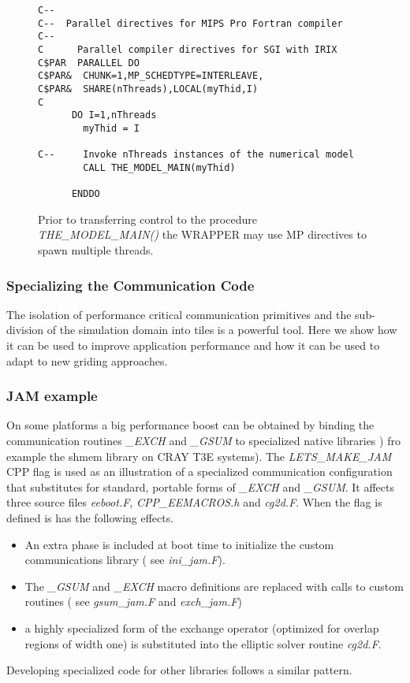 \begin{figure}
\begin{verbatim}
C--
C--  Parallel directives for MIPS Pro Fortran compiler
C--
C      Parallel compiler directives for SGI with IRIX
C$PAR  PARALLEL DO
C$PAR&  CHUNK=1,MP_SCHEDTYPE=INTERLEAVE,
C$PAR&  SHARE(nThreads),LOCAL(myThid,I)
C
      DO I=1,nThreads
        myThid = I

C--     Invoke nThreads instances of the numerical model
        CALL THE_MODEL_MAIN(myThid)

      ENDDO
\end{verbatim}
\caption{Prior to transferring control to
the procedure {\em THE\_MODEL\_MAIN()} the WRAPPER may use
MP directives to spawn multiple threads.
} \label{fig:mp_directives}
\end{figure}


\subsubsection{Specializing the Communication Code}

The isolation of performance critical communication primitives and the
sub-division of the simulation domain into tiles is a powerful tool.
Here we show how it can be used to improve application performance and
how it can be used to adapt to new griding approaches.

\subsubsection{JAM example}
\label{sec:jam_example}
On some platforms a big performance boost can be obtained by
binding the communication routines {\em \_EXCH} and
{\em \_GSUM} to specialized native libraries ) fro example the
shmem library on CRAY T3E systems). The {\em LETS\_MAKE\_JAM} CPP flag 
is used as an illustration of a specialized communication configuration 
that substitutes for standard, portable forms of {\em \_EXCH} and 
{\em \_GSUM}. It affects three source files {\em eeboot.F}, 
{\em CPP\_EEMACROS.h} and {\em cg2d.F}. When the flag is defined
is has the following effects.
\begin{itemize}
\item An extra phase is included at boot time to initialize the custom 
communications library ( see {\em ini\_jam.F}).
\item The {\em \_GSUM} and {\em \_EXCH} macro definitions are replaced
with calls to custom routines ( see {\em gsum\_jam.F} and {\em exch\_jam.F})
\item a highly specialized form of the exchange operator (optimized
for overlap regions of width one) is substituted into the elliptic
solver routine {\em cg2d.F}.
\end{itemize}
Developing specialized code for other libraries follows a similar
pattern.

